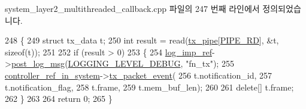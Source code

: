 system\+\_\+layer2\+\_\+multithreaded\+\_\+callback.\+cpp 파일의 247 번째 라인에서 정의되었습니다.


\begin{DoxyCode}
248 \{
249     \textcolor{keyword}{struct }tx\_data t;
250     \textcolor{keywordtype}{int} result = read(\hyperlink{classavdecc__lib_1_1system__layer2__multithreaded__callback_a3709435136aa29f099b91ff297640b5b}{tx\_pipe}[\hyperlink{classavdecc__lib_1_1system__layer2__multithreaded__callback_a617559bbc3d02eeb189fad2c9979ef53a34b39c5d9253fea845d499c840c5fe60}{PIPE\_RD}], &t, \textcolor{keyword}{sizeof}(t));
251 
252     \textcolor{keywordflow}{if} (result > 0)
253     \{
254         \hyperlink{namespaceavdecc__lib_acbe3e2a96ae6524943ca532c87a28529}{log\_imp\_ref}->\hyperlink{classavdecc__lib_1_1log_a68139a6297697e4ccebf36ccfd02e44a}{post\_log\_msg}(\hyperlink{namespaceavdecc__lib_a501055c431e6872ef46f252ad13f85cdae3138c2a0a71a6404155ff912e450406}{LOGGING\_LEVEL\_DEBUG}, \textcolor{stringliteral}{"fn\_tx"});
255         \hyperlink{namespaceavdecc__lib_a8f621b84ee2ae87ab9a54ca441e21f9b}{controller\_ref\_in\_system}->\hyperlink{classavdecc__lib_1_1controller__imp_a925e4ecb60a5e6afb6b8f99997ed0f35}{tx\_packet\_event}(
256             t.notification\_id,
257             t.notification\_flag,
258             t.frame,
259             t.mem\_buf\_len);
260 
261         \textcolor{keyword}{delete}[] t.frame;
262     \}
263 
264     \textcolor{keywordflow}{return} 0;
265 \}
\end{DoxyCode}


